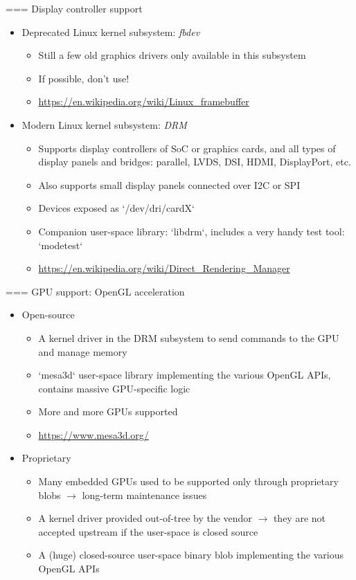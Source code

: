=== {Display controller support}
  \begin{itemize}
  \item Deprecated Linux kernel subsystem: {\em fbdev}
    \begin{itemize}
    \item Still a few old graphics drivers only available in this subsystem
    \item If possible, don't use!
    \item \url{https://en.wikipedia.org/wiki/Linux_framebuffer}
    \end{itemize}
  \item Modern Linux kernel subsystem: {\em DRM}
    \begin{itemize}
    \item Supports display controllers of SoC or graphics cards, and
      all types of display panels and bridges: parallel, LVDS, DSI,
      HDMI, DisplayPort, etc.
    \item Also supports small display panels connected over I2C or SPI
    \item Devices exposed as `/dev/dri/cardX`
    \item Companion user-space library: `libdrm`, includes a very
      handy test tool: `modetest`
    \item \url{https://en.wikipedia.org/wiki/Direct_Rendering_Manager}
    \end{itemize}
  \end{itemize}


=== {GPU support: OpenGL acceleration}
  \begin{itemize}
  \item Open-source
    \begin{itemize}
    \item A kernel driver in the DRM subsystem to send commands to the
      GPU and manage memory
    \item `mesa3d` user-space library implementing the various
      OpenGL APIs, contains massive GPU-specific logic
    \item More and more GPUs supported
    \item \url{https://www.mesa3d.org/}
    \end{itemize}
  \item Proprietary
    \begin{itemize}
    \item Many embedded GPUs used to be supported only through
      proprietary blobs $\rightarrow$ long-term maintenance issues
    \item A kernel driver provided out-of-tree by the vendor
      $\rightarrow$ they are not accepted upstream if the user-space
      is closed source
    \item A (huge) closed-source user-space binary blob implementing
      the various OpenGL APIs
    \end{itemize}
  \end{itemize}


